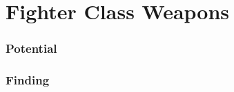 \section{Fighter Class Weapons}

\subsubsection{}

\subsubsection{Potential}

\subsubsection{Finding }